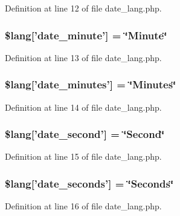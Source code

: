 Definition at line 12 of file date\-\_\-lang.\-php.

\subsubsection[{\$lang}]{\setlength{\rightskip}{0pt plus 5cm}\$lang['date\-\_\-minute'] = \char`\"{}Minute\char`\"{}}\label{date__lang_8php_a999a95f4f9c529af571d30f9615c93f3}


Definition at line 13 of file date\-\_\-lang.\-php.

\subsubsection[{\$lang}]{\setlength{\rightskip}{0pt plus 5cm}\$lang['date\-\_\-minutes'] = \char`\"{}Minutes\char`\"{}}\label{date__lang_8php_ab41862e6c3ef784a6e32992cfb9a6e1c}


Definition at line 14 of file date\-\_\-lang.\-php.

\subsubsection[{\$lang}]{\setlength{\rightskip}{0pt plus 5cm}\$lang['date\-\_\-second'] = \char`\"{}Second\char`\"{}}\label{date__lang_8php_ac1b67b9034a78d631bf5302df6105136}


Definition at line 15 of file date\-\_\-lang.\-php.

\subsubsection[{\$lang}]{\setlength{\rightskip}{0pt plus 5cm}\$lang['date\-\_\-seconds'] = \char`\"{}Seconds\char`\"{}}\label{date__lang_8php_a0a75c76e6e4be09a6c5f1a1727fa2c78}


Definition at line 16 of file date\-\_\-lang.\-php.

